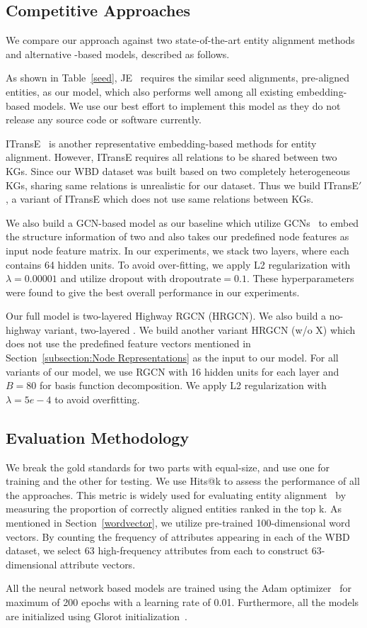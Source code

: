 	\subsection{Competitive Approaches}
	We compare our approach against two state-of-the-art entity alignment methods~\cite{hao2016joint,zhu2017iterative} and alternative \GCN-based models, described as follows.

	 As shown in Table~\ref{seed}, JE~\cite{hao2016joint} requires the similar seed alignments, pre-aligned entities, as our model, which also performs well among all existing embedding-based models. We use our best effort to implement this model as they do not release any source code or software currently.
	
	 ITransE~\cite{zhu2017iterative} is another representative embedding-based methods for entity alignment. However, ITransE requires all relations to be shared between two KGs. Since our WBD dataset was built based on two completely heterogeneous KGs, sharing same relations is unrealistic for our dataset. Thus we build ITransE$'$, a variant of ITransE which does not use same relations between KGs.
	
	 We also build a GCN-based model as our baseline which utilize GCNs~\cite{Kipf2016Semi} to embed the structure information of two \KGs and also takes our predefined node features as input node feature matrix. In our experiments, we stack two \GCN layers, where each \GCN contains 64 hidden units. To avoid over-fitting, we apply L2 regularization with $\lambda=0.00001$ and utilize dropout with $\mathrm{dropout rate}=0.1$.
    These hyperparameters were found to give the best overall performance in our experiments.
	
	 Our full model is two-layered Highway RGCN (HRGCN). We also build a no-highway variant, two-layered \RGCN. We build another variant HRGCN (w/o X) which does not use the predefined feature vectors mentioned in Section~\ref{subsection:Node Representations} as the input to our model.
	For all variants of our model, we use RGCN with 16 hidden units for each layer and $B = 80$ for basis function decomposition. We apply L2 regularization with $\lambda=5e-4$ to avoid overfitting.



	\subsection{Evaluation Methodology}
	We break the gold standards for two parts with equal-size, and use one for training and the other for testing. We use Hits@k to assess the performance of all the approaches. This metric is widely used for evaluating entity alignment~\FIXME{\cite{}} by measuring the proportion of correctly aligned entities ranked in the top k.
    As mentioned in Section~\ref{wordvector}, we utilize pre-trained 100-dimensional word vectors. By counting the frequency of attributes appearing in each \KG of the WBD dataset, we select 63 high-frequency attributes from each \KG to construct 63-dimensional attribute vectors.


    All the neural network based models are trained using the Adam optimizer~\cite{Kingma2014Adam} for maximum of 200 epochs with a learning rate
    of 0.01. Furthermore, all the models are initialized using Glorot initialization~\cite{Glorot2010Understanding}.
	
